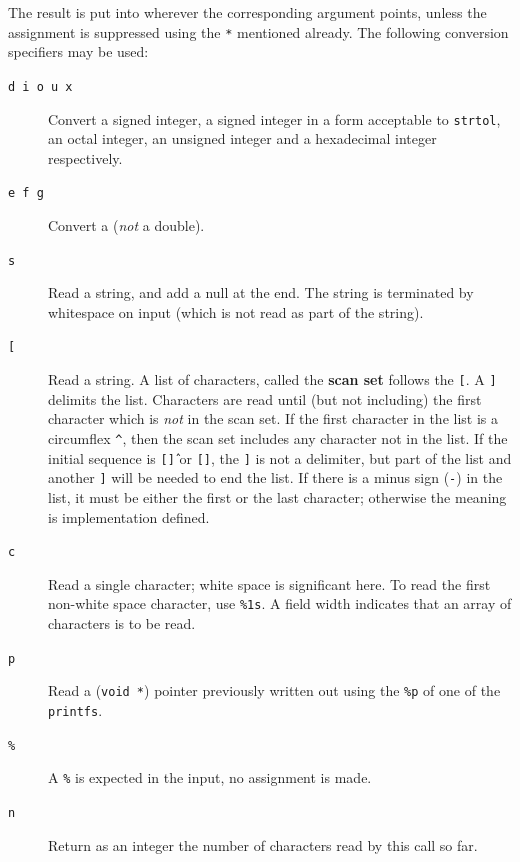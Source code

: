    The result is put into wherever the corresponding argument points, unless
    the assignment is suppressed using the \texttt{*} mentioned already.
    The following conversion specifiers may be used:


   \begin{description}
    \item[\texttt{d i o u x}] Convert a signed integer, a signed integer in a form
     acceptable to \texttt{strtol}, an octal integer, an unsigned
     integer and a hexadecimal integer respectively.

    \item[\texttt{e f g}] Convert a \float{} (\textit{not} a double).

    \item[\texttt{s}] Read a string, and add a null at the end.  The string is
     terminated by whitespace on input (which is not read as
     part of the string).

   \item[\texttt{[}] Read a string.
     A list of characters, called the \textbf{scan set}
     follows the \texttt{[}. A \texttt{]} delimits the list. Characters
     are read until (but not including) the first character which is
     \textit{not} in the scan set.  If the first character in the list
     is a circumflex \texttt{\^}, then the scan set includes any
     character not in the list.  If the initial sequence is
     \texttt{[\^]} or \texttt{[]}, the \texttt{]} is not a
     delimiter, but part of the list and another \texttt{]} will be needed
     to end the list.  If there is a minus sign (\texttt{-}) in the list,
     it must be either the first or the last character; otherwise the meaning
     is implementation defined.

    \item[\texttt{c}] Read a single character; white space is significant here.
     To read the first non-white space character, use \texttt{\%1s}.  A
     field width indicates that an array of characters is to
     be read.

    \item[\texttt{p}] Read a (\texttt{void *}) pointer previously written out using
     the \texttt{\%p} of one of the \texttt{printfs}.

    \item[\texttt{\%}] A \texttt{\%} is expected in the input, no assignment is made.

    \item[\texttt{n}] Return as an integer the number of characters read by
     this call so far.
   \end{description}

